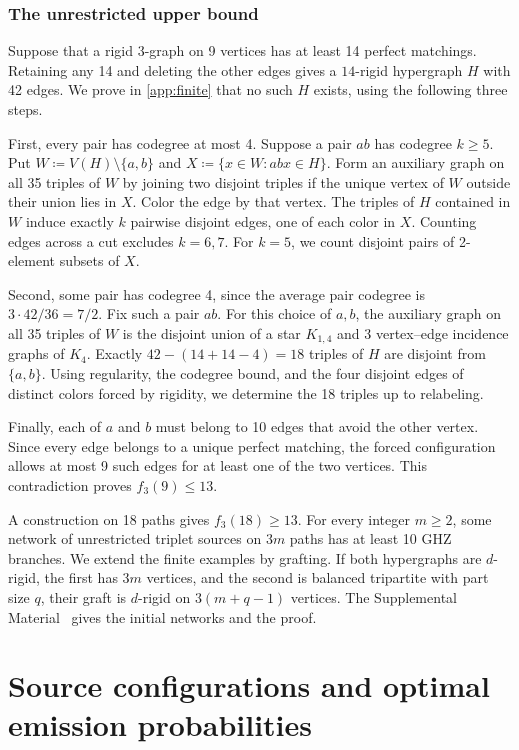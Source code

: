 \documentclass[10pt]{article}
\numberwithin{equation}{section}
\theoremstyle{definition}
\begin{document}
\subsubsection*{The unrestricted upper bound}

Suppose that a rigid $3$-graph on 9 vertices has at least 14 perfect matchings. Retaining any 14 and deleting the other edges gives a $14$-rigid hypergraph $H$ with 42 edges. We prove in \cref{app:finite} that no such $H$ exists, using the following three steps.

First, every pair has codegree at most 4. Suppose a pair $ab$ has codegree $k\ge5$. Put $W\coloneqq V(H)\setminus\{a,b\}$ and $X\coloneqq\{x\in W\colon abx\in H\}$. Form an auxiliary graph on all 35 triples of $W$ by joining two disjoint triples if the unique vertex of $W$ outside their union lies in $X$. Color the edge by that vertex. The triples of $H$ contained in $W$ induce exactly $k$ pairwise disjoint edges, one of each color in $X$. Counting edges across a cut excludes $k=6,7$. For $k=5$, we count disjoint pairs of 2-element subsets of $X$.

Second, some pair has codegree 4, since the average pair codegree is $3\cdot42/36=7/2$. Fix such a pair $ab$. For this choice of $a,b$, the auxiliary graph on all 35 triples of $W$ is the disjoint union of a star $K_{1,4}$ and 3 vertex--edge incidence graphs of $K_4$. Exactly $42-(14+14-4)=18$ triples of $H$ are disjoint from $\{a,b\}$. Using regularity, the codegree bound, and the four disjoint edges of distinct colors forced by rigidity, we determine the 18 triples up to relabeling.

Finally, each of $a$ and $b$ must belong to 10 edges that avoid the other vertex. Since every edge belongs to a unique perfect matching, the forced configuration allows at most 9 such edges for at least one of the two vertices. This contradiction proves $f_3(9)\le13$.

A construction on 18 paths gives $f_3(18)\ge13$. For every integer $m\ge2$, some network of unrestricted triplet sources on $3m$ paths has at least 10 GHZ branches. We extend the finite examples by grafting. If both hypergraphs are $d$-rigid, the first has $3m$ vertices, and the second is balanced tripartite with part size $q$, their graft is $d$-rigid on $3(m+q-1)$ vertices. The Supplemental Material~\cite{LiLiuSupplement} gives the initial networks and the proof.

\section{Source configurations and optimal emission probabilities}\label{sec:resources}
\end{document}
